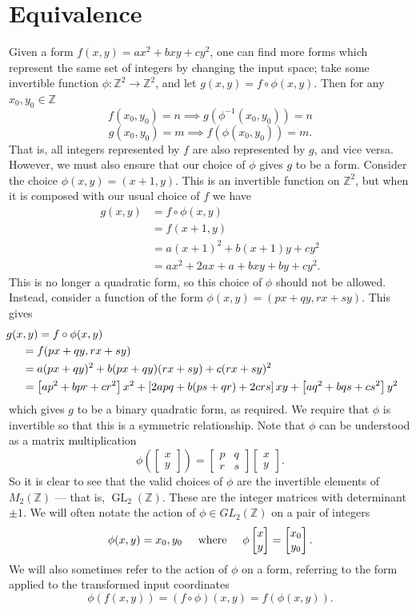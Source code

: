 \documentclass[honours,12pt]{unswthesis}
\newcommand{\Z}{\mathbb{Z}} %
\DeclareMathOperator{\GL}{GL}
\newcommand{\bmat}[1]{\begin{bmatrix}#1\end{bmatrix}}
\numberwithin{equation}{section}
\begin{document}
\section{Equivalence}\label{s-forms-eq}
Given a form $f(x, y) = ax^2 + bxy + cy^2$, one can find more forms which represent the same set of integers by changing the input space;
take some invertible function $\phi : \Z^2 \rightarrow \Z^2$, and let $g(x, y) = f \circ \phi(x, y)$.
Then for any $x_0, y_0 \in \Z$
$$f(x_0, y_0) = n \implies g(\phi^{-1}(x_0, y_0)) = n$$
$$g(x_0, y_0) = m \implies f(\phi(x_0, y_0)) = m.$$
That is, all integers represented by $f$ are also represented by $g$, and vice versa. 
However, we must also ensure that our choice of $\phi$ gives $g$ to be a form.
Consider the choice $\phi(x, y) = (x+1, y)$.
This is an invertible function on $\Z^2$, but when it is composed with our usual choice of $f$ we have
\begin{align*}
    g(x, y) &= f \circ \phi(x, y) \\
    &= f(x+1, y) \\
    &= a(x+1)^2 + b(x+1)y + cy^2 \\
    &= ax^2 + 2ax + a + bxy + by + cy^2.
\end{align*}
This is no longer a quadratic form, so this choice of $\phi$ should not be allowed. 
Instead, consider a function of the form $\phi(x, y) = (px+qy, rx+sy)$.
This gives
\begin{align*}
    &\hspace{-5mm} g(x, y) = f \circ \phi(x, y) \\
    &= f(px+qy, rx+sy) \\
    &= a(px+qy)^2 + b(px+qy)(rx+sy) + c(rx+sy)^2 \\
    &= \left[ap^2 + bpr + cr^2 \right] x^2
        + \left[ 2apq + b(ps + qr) + 2crs \right] xy
        + \left[ aq^2 + bqs + cs^2 \right] y^2
\end{align*}
which gives $g$ to be a binary quadratic form, as required. 
We require that $\phi$ is invertible so that this is a symmetric relationship.
Note that $\phi$ can be understood as a matrix multiplication
$$\phi \left( \bmat{x \\ y} \right) = \bmat{p & q \\ r & s} \bmat{x \\ y}.$$
So it is clear to see that the valid choices of $\phi$ are the invertible elements of $M_2(\Z)$ --- that is, $\GL_2(\Z)$.
These are the integer matrices with determinant $\pm 1$.
We will often notate the action of $\phi \in GL_2(\Z)$ on a pair of integers
$$\phi(x, y) = x_0, y_0 \hspace{5mm} \text{where} \hspace{5mm} \phi \bmat{x \\ y} = \bmat{x_0 \\ y_0}.$$
We will also sometimes refer to the action of $\phi$ on a form, referring to the form applied to the transformed input coordinates 
$$\phi(f(x, y)) = (f \circ \phi)(x, y) = f(\phi(x, y)).$$
\end{document}
